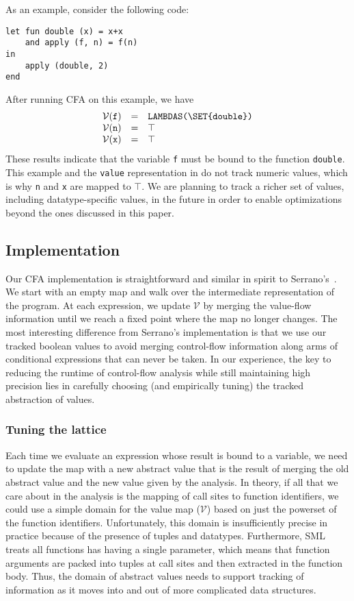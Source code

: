 As an example, consider the following code:
\begin{lstlisting}[basicstyle=\ttfamily\scriptsize\color{\cdColor}]
let fun double (x) = x+x
    and apply (f, n) = f(n)
in
    apply (double, 2)
end
\end{lstlisting}%
After running CFA on this example, we have
\begin{displaymath}
  \begin{array}{rcl}
    \mathcal{V}(\texttt{f}) & = & \texttt{LAMBDAS(\SET{double})} \\
    \mathcal{V}(\texttt{n}) & = & \top \\
    \mathcal{V}(\texttt{x}) & = & \top
  \end{array}
\end{displaymath}%
These results indicate that the variable \lstinline{f} must be bound to the 
function \lstinline{double}.
This example and the \lstinline{value} representation in  do not
track numeric values, which is why \lstinline{n} and \lstinline{x} are mapped to $\top$.
We are planning to track a richer set of values, including datatype-specific values, in the future
in order to enable optimizations beyond the ones discussed in this paper.

\subsection{Implementation}
Our CFA implementation is straightforward and similar in spirit to Serrano's~\cite{serrano:cfa-paradigm}.
We start with an empty map and walk over the intermediate representation of the 
program.
At each expression, we update $\mathcal{V}$ by merging the value-flow information
until we reach a fixed point where the map no longer changes.
The most interesting difference from Serrano's implementation is that
we use our tracked boolean values to avoid merging control-flow information
along arms of conditional expressions that can never be taken.
In our experience, the key to reducing the runtime of control-flow analysis while still
maintaining high precision lies in carefully choosing (and empirically tuning)
the tracked abstraction of values.

\subsubsection{Tuning the lattice}
Each time we evaluate an expression whose result is bound to a variable, we need
to update the map with a new abstract value that is the result of merging the
old abstract value and the new value given by the analysis.
In theory, if all that we care about in the analysis is the mapping of call
sites to function identifiers, we could use a simple domain for the
value map ($\mathcal{V}$) based on just the powerset of the function identifiers.
Unfortunately, this domain is insufficiently precise in practice because of the presence of
tuples and datatypes.
Furthermore, SML treats all functions has having a single parameter, which means that
function arguments are packed into tuples at call sites and then extracted in the function
body.
Thus, the domain of abstract values needs to support tracking of information as it moves
into and out of more complicated data structures.

